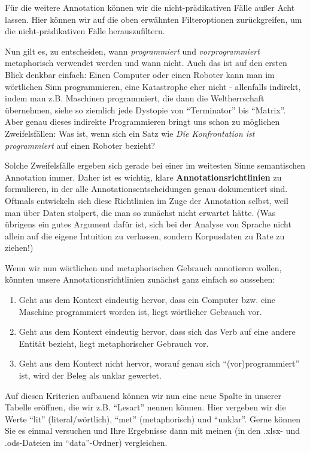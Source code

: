 \documentclass[]{article}
\begin{document}
Für die weitere Annotation können wir die nicht-prädikativen Fälle außer
Acht lassen. Hier können wir auf die oben erwähnten Filteroptionen
zurückgreifen, um die nicht-prädikativen Fälle herauszufiltern.

Nun gilt es, zu entscheiden, wann \emph{programmiert} und
\emph{vorprogrammiert} metaphorisch verwendet werden und wann nicht.
Auch das ist auf den ersten Blick denkbar einfach: Einen Computer oder
einen Roboter kann man im wörtlichen Sinn programmieren, eine
Katastrophe eher nicht - allenfalls indirekt, indem man z.B. Maschinen
programmiert, die dann die Weltherrschaft übernehmen, siehe so ziemlich
jede Dystopie von ``Terminator'' bis ``Matrix''. Aber genau dieses
indirekte Programmieren bringt uns schon zu möglichen Zweifelsfällen:
Was ist, wenn sich ein Satz wie \emph{Die Konfrontation ist
programmiert} auf einen Roboter bezieht?

Solche Zweifelsfälle ergeben sich gerade bei einer im weitesten Sinne
semantischen Annotation immer. Daher ist es wichtig, klare
\textbf{Annotationsrichtlinien} zu formulieren, in der alle
Annotationsentscheidungen genau dokumentiert sind. Oftmals entwickeln
sich diese Richtlinien im Zuge der Annotation selbst, weil man über
Daten stolpert, die man so zunächst nicht erwartet hätte. (Was übrigens
ein gutes Argument dafür ist, sich bei der Analyse von Sprache nicht
allein auf die eigene Intuition zu verlassen, sondern Korpusdaten zu
Rate zu ziehen!)

Wenn wir nun wörtlichen und metaphorischen Gebrauch annotieren wollen,
könnten unsere Annotationsrichtlinien zunächst ganz einfach so aussehen:

\begin{enumerate}
\def\labelenumi{\arabic{enumi}.}
\item
  Geht aus dem Kontext eindeutig hervor, dass ein Computer bzw. eine
  Maschine programmiert worden ist, liegt wörtlicher Gebrauch vor.
\item
  Geht aus dem Kontext eindeutig hervor, dass sich das Verb auf eine
  andere Entität bezieht, liegt metaphorischer Gebrauch vor.
\item
  Geht aus dem Kontext nicht hervor, worauf genau sich
  ``(vor)programmiert'' ist, wird der Beleg als unklar gewertet.
\end{enumerate}

Auf diesen Kriterien aufbauend können wir nun eine neue Spalte in
unserer Tabelle eröffnen, die wir z.B. ``Lesart'' nennen können. Hier
vergeben wir die Werte ``lit'' (literal/wörtlich), ``met''
(metaphorisch) und ``unklar''. Gerne können Sie es einmal versuchen und
Ihre Ergebnisse dann mit meinen (in den .xlsx- und .ods-Dateien im
``data''-Ordner) vergleichen.
\end{document}
